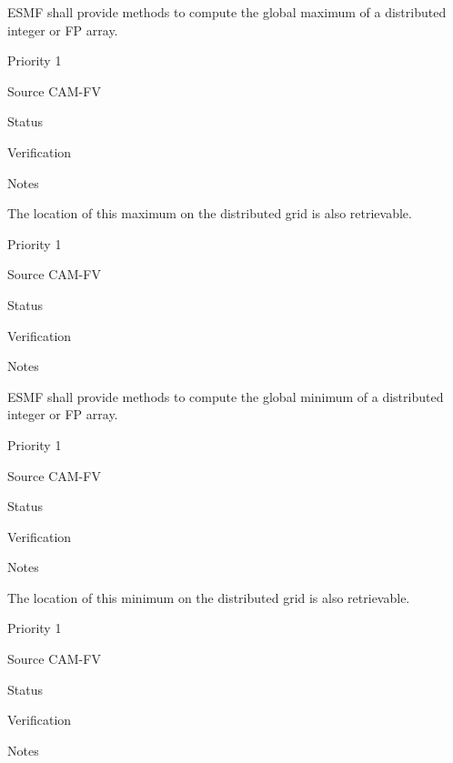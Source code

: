 
ESMF shall provide methods to compute the global maximum of a
distributed integer or FP array.

\begin{reqlist}
\item[Priority] 1
\item[Source] CAM-FV
\item[Status]
\item[Verification]
\item[Notes]
\end{reqlist}



The location of this maximum on the distributed grid is also
retrievable.

\begin{reqlist}
\item[Priority] 1
\item[Source] CAM-FV
\item[Status]
\item[Verification]
\item[Notes]
\end{reqlist}



ESMF shall provide methods to compute the global minimum of a
distributed integer or FP array.

\begin{reqlist}
\item[Priority] 1
\item[Source] CAM-FV
\item[Status]
\item[Verification]
\item[Notes]
\end{reqlist}



The location of this minimum on the distributed grid is also
retrievable.

\begin{reqlist}
\item[Priority] 1
\item[Source] CAM-FV
\item[Status]
\item[Verification]
\item[Notes]
\end{reqlist}



